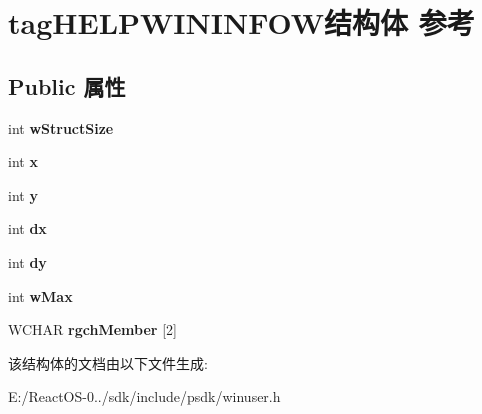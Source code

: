 \hypertarget{structtag_h_e_l_p_w_i_n_i_n_f_o_w}{}\section{tag\+H\+E\+L\+P\+W\+I\+N\+I\+N\+F\+O\+W结构体 参考}
\label{structtag_h_e_l_p_w_i_n_i_n_f_o_w}
\subsection*{Public 属性}
\begin{DoxyCompactItemize}
\item 
\mbox{\label{structtag_h_e_l_p_w_i_n_i_n_f_o_w_a0ba677837713b034dedf615ddae534d8}} 
int {\bfseries w\+Struct\+Size}
\item 
\mbox{\label{structtag_h_e_l_p_w_i_n_i_n_f_o_w_aa16678e4a1533a4ea8bf0c3dd721bb17}} 
int {\bfseries x}
\item 
\mbox{\label{structtag_h_e_l_p_w_i_n_i_n_f_o_w_aee07e4cfa03b1d3c9180f4123042ecda}} 
int {\bfseries y}
\item 
\mbox{\label{structtag_h_e_l_p_w_i_n_i_n_f_o_w_a18124cdb831cf779c3682e7cef520b05}} 
int {\bfseries dx}
\item 
\mbox{\label{structtag_h_e_l_p_w_i_n_i_n_f_o_w_ab52a48abdcceb434d01e3a45f6c1de23}} 
int {\bfseries dy}
\item 
\mbox{\label{structtag_h_e_l_p_w_i_n_i_n_f_o_w_aace05dd71f1e92449f5fd7cae1e711f4}} 
int {\bfseries w\+Max}
\item 
\mbox{\label{structtag_h_e_l_p_w_i_n_i_n_f_o_w_ab4bab923b0769557238e9a595fd39fb3}} 
W\+C\+H\+AR {\bfseries rgch\+Member} \mbox{[}2\mbox{]}
\end{DoxyCompactItemize}


该结构体的文档由以下文件生成\+:\begin{DoxyCompactItemize}
\item 
E\+:/\+React\+O\+S-\/0../sdk/include/psdk/winuser.\+h\end{DoxyCompactItemize}
